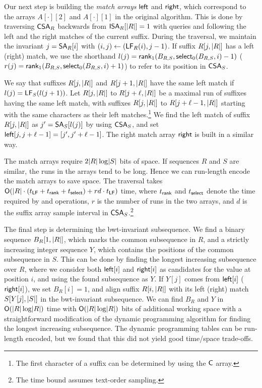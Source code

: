 Our next step is building the \emph{match arrays} $\mathsf{left}$ and $\mathsf{right}$,
which correspond to the arrays $A[\cdot][2]$ and $A[\cdot][1]$ in the original
algorithm. This is done by traversing $\mathsf{CSA}_{R}$ backwards from
$\mathsf{ISA}_{R}[\lvert R \rvert] = 1$ with \LF{} queries and following the left and the
right matches of the current suffix. During the traversal, we maintain
the invariant $j = \mathsf{SA}_{R}[i]$ with $(i,j) \leftarrow (\mathsf{LF}_{R}(i), j-1)$. If
suffix $R[j,\lvert R \rvert]$ has a left (right) match, we use the shorthand $l(j) =
\mathsf{rank}_{1}(B_{R,S}, \mathsf{select}_{0}(B_{R,S}, i)-1)$ ($r(j) = \mathsf{rank}_{1}(B_{R,S},
\mathsf{select}_{0}(B_{R,S}, i)+1)$) to refer to its position in $\mathsf{CSA}_{S}$.

We say that suffixes $R[j,\lvert R \rvert]$ and $R[j+1,\lvert R \rvert]$ have the same left
match if $l(j) = \mathsf{LF}_{S}(l(j+1))$. Let $R[j,\lvert R \rvert]$ to $R[j+\ell,\lvert R \rvert]$
be a maximal run of suffixes having the same left match, with suffixes
$R[j,\lvert R \rvert]$ to $R[j+\ell-1,\lvert R \rvert]$ starting with the same characters as
their left matches.\footnote{The first character of a suffix can be determined
by using the $\mathsf{C}$ array.} We find the left match of suffix $R[j,\lvert R \rvert]$ as
$j' = \mathsf{SA}_{S}[l(j)]$ by using $\mathsf{CSA}_{S}$, and set $\mathsf{left}[j,j+\ell-1] =
[j',j'+\ell-1]$. The right match array $\mathsf{right}$ is built in a similar way.

The match arrays require $2\lvert R \rvert \log \lvert S \rvert$ bits of space. If sequences
$R$ and $S$ are similar, the runs in the arrays tend to be long. Hence we can
run-length encode the match arrays to save space. The traversal takes
$\mathsf{O}(\lvert R \rvert \cdot (t_{\mathsf{LF}} + t_{\mathsf{rank}} + t_{\mathsf{select}}) + rd \cdot
t_{\mathsf{LF}})$ time, where $t_{\mathsf{rank}}$ and $t_{\mathsf{select}}$ denote the time
required by \rank{} and \select{} operations, $r$ is the number of runs in the
two arrays, and $d$ is the suffix array sample interval in
$\mathsf{CSA}_{S}$.\footnote{The time bound assumes text-order sampling.}

The final step is determining the bwt-invariant subsequence. We find a
binary sequence $B_{R}[1,\lvert R \rvert]$, which marks the common subsequence in $R$,
and a strictly increasing integer sequence $Y$, which contains the positions
of the common subsequence in $S$. This can be done by finding the longest
increasing subsequence over $R$, where we consider both $\mathsf{left}[i]$ and
$\mathsf{right}[i]$ as candidates for the value at position $i$, and using the found
subsequence as $Y$. If $Y[j]$ comes from $\mathsf{left}[i]$ ($\mathsf{right}[i]$), we set
$B_{R}[i] = 1$, and align suffix $R[i, \lvert R \rvert]$ with its
left (right) match $S[Y[j], \lvert S \rvert]$ in the bwt-invariant subsequence. We can
find $B_{R}$ and $Y$ in $\mathsf{O}(\lvert R \rvert \log \lvert R \rvert)$ time with
$\mathsf{O}(\lvert R \rvert \log \lvert R \rvert)$ bits of additional working space with a
straightforward modification of the dynamic programming algorithm for finding
the longest increasing subsequence. The dynamic programming tables can be
run-length encoded, but we found that this did not yield good time/space
trade-offs.

